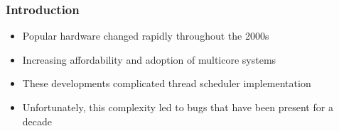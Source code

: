 \documentclass{beamer}
\newcommand{\linespace}{\vskip 0.25cm}
\begin{document}
\begin{frame}
\frametitle{Introduction}

\begin{itemize}
\item Popular hardware changed rapidly throughout the 2000s

\linespace

\item Increasing affordability and adoption of multicore systems

\linespace

\item These developments complicated thread scheduler implementation

\linespace

\item Unfortunately, this complexity led to bugs that have been present for a decade
\end{itemize}
\end{frame}
\end{document}
